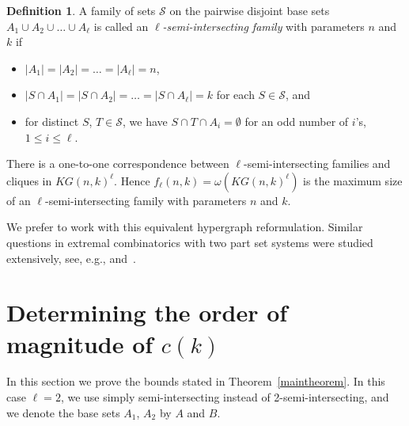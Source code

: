 \documentclass[12pt,a4paper]{amsart}
\numberwithin{equation}{section}
\theoremstyle{plain}
\theoremstyle{definition}
\newtheorem{Def}[Th]{Definition}
\newcommand{\m}{\mathcal}
\newcommand{\NN}{n}
\begin{document}
\begin{Def}
A family of sets $\mathcal{S}$ on the pairwise disjoint base sets $A_1 \cup A_2 \cup \ldots \cup A_\ell $ is called an $\ell ${\em -semi-intersecting family} with parameters $\NN$ and $k$ if %
\begin{itemize}
    \item $|A_1|=|A_2| =\dots =|A_\ell|=n$,
    \item $|S\cap A_1|=|S\cap A_2|=\ldots=|S\cap A_\ell |=k$ for each $S \in \mathcal{S}$, and
    \item for distinct $S$, $T \in \m{S}$, we have $S\cap T\cap A_i=\emptyset$ for an odd number of $i$'s, $1 \leq i \leq \ell$.
\end{itemize}
\end{Def}

There is a one-to-one correspondence between $\ell$-semi-intersecting families and cliques in $KG(\NN,k)^\ell$. Hence
 $f_\ell (\NN,k)= \omega \left(KG(\NN,k)^\ell\right)$ is the maximum size of an  $\ell $-semi-intersecting family with parameters $\NN$ and $k$.


We prefer to work with this equivalent hypergraph reformulation. %
Similar questions in extremal combinatorics with two part set systems were studied extensively, see, e.g., \cite{gerbner2012almost} and~\cite{article}.



\section{Determining the order of magnitude of $c(k)$} \label{twosets}


In this section we prove the bounds stated in Theorem~\ref{maintheorem}.
In this case $\ell=2$, we use simply semi-intersecting instead of 2-semi-intersecting, and we denote the base sets $A_1$, $A_2$ by $A$ and $B$.
\end{document}
